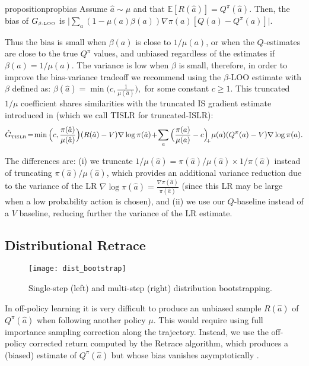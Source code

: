 \documentclass{article}
\newcommand{\beqan}{\begin{eqnarray*}}
\newcommand{\eeqan}{\end{eqnarray*}}
\newcommand{\E}{{\mathbb E}}
\newcommand{\action}{{\hat a}}
\begin{document}
\begin{restatable}{proposition}{propbias}\label{prop:bias}
Assume $\action\sim \mu$ and that $\E[R(\action)]=Q^{\pi}(\action)$. Then, 
the bias of $G_{\mbox{\tiny $\beta$-LOO}}$ is $\big| \sum_a (1-\mu(a)\beta(a)) 
\nabla\pi(a) [Q(a)-Q^{\pi}(a)]\big|$.
\end{restatable}
Thus the bias is small when $\beta(a)$ is close to $1/\mu(a)$, or 
when the $Q$-estimates are close to the true $Q^{\pi}$ values, and unbiased
regardless of the estimates if $\beta(a) = 1/\mu(a)$. The variance 
is low when $\beta$ is small, therefore, in order to improve the bias-variance tradeoff 
we recommend using the $\beta$-LOO estimate with $\beta$ defined as:
$\beta(\action) = \min\big( c, \frac{1}{\mu(\action)}\big),$ for some constant
$c\geq 1$. This truncated $1/\mu$ coefficient shares similarities with the truncated IS 
gradient estimate introduced in \citep{wang2017sample} (which we call TISLR for 
truncated-ISLR):
\beqan
\hat G_{\mbox{\tiny TISLR}}\! = \!\min\Big(c, \frac{\pi(\action)}{\mu(\action)}\Big) 
(R(\action) - V) \nabla\log\pi(\action)  \! + \! \sum_a \Big( \frac{\pi(a)}{\mu(a)}-c 
\Big)_{\!\! +} \mu(a) 
(Q^{\pi}(a) - V) \nabla\log\pi(a) .
\eeqan

The differences are: (i) we truncate $1/\mu(\action) = \pi(\action)/\mu(\action)\times 1/\pi(\action)$ 
instead of truncating $ \pi(\action)/\mu(\action)$, which provides an additional variance 
reduction due to the variance of the LR 
$\nabla\log\pi(\action)=\frac{\nabla\pi(\action)}{\pi(\action)}$ (since this LR may be large when 
a low probability action is chosen), and (ii) we use our $Q$-baseline instead 
of a $V$ baseline, reducing further the variance of the LR estimate.


\subsection{Distributional Retrace}\label{sec:dist_retrace}
\begin{figure}
\centering
\texttt{[image: dist\_bootstrap]}
  \caption{Single-step (left) and multi-step (right) distribution bootstrapping.}
  \label{distributions-multi-step}
\end{figure}
In off-policy learning it is very difficult to produce an 
unbiased sample $R(\action)$ of $Q^{\pi}(\action)$ when following another policy $\mu$. 
This would require using full importance sampling correction along the 
trajectory.  Instead, we use the off-policy corrected return computed 
by the Retrace algorithm, which produces a (biased) estimate of $Q^{\pi}(\action)$ 
but whose bias vanishes asymptotically \citep{munos2016safe}.
\end{document}
